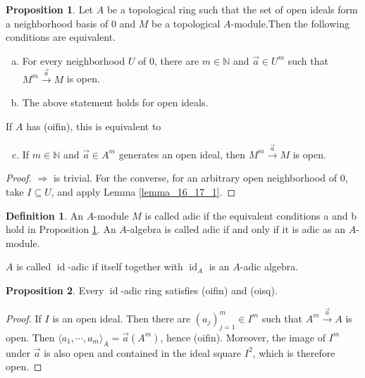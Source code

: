 \documentclass[10pt]{article}
\numberwithin{equation}{section}
\theoremstyle{definition}
\newtheorem{proposition}{Proposition}[subsection]
\newtheorem{definition}{Definition}[subsection]
\DeclareMathOperator{\id}{id}
\newcommand{\N}[0]{\mathbb{N}}
\begin{document}
\begin{proposition}
    \label{fact_16_18}
    Let $A$ be a topological ring such that the set of open ideals form a neighborhood basis of $0$ and $M$ be a topological $A$-module.Then the following conditions are equivalent.
    \begin{enumerate}[a.]
        \item For every neighborhood $U$ of $0$, there are $m\in\N$ and $\vec{a}\in U^m$ such that $M^m\stackrel{\vec{a}}{\to}M$ is open.
        \item The above statement holds for open ideals.
    \end{enumerate}
    If $A$ has (oifin), this is equivalent to
    \begin{enumerate}[a.]\setcounter{enumi}{2}
        \item If $m\in\N$ and $\vec{a}\in A^m$ generates an open ideal, then $M^m\stackrel{\vec{a}}{\to}M$ is open.
    \end{enumerate}
\end{proposition}
\begin{proof}
    $\Rightarrow$ is trivial. For the converse, for an arbitrary open neighborhood of $0$, take $I\subseteq U$, and apply Lemma \ref{lemma_16_17_1}.
\end{proof}
\begin{definition}
    An $A$-module $M$ is called adic if the equivalent conditions a and b hold in Proposition \ref{fact_16_18}. An $A$-algebra is called adic if and only if it is adic as an $A$-module.
    \par $A$ is called $\id$-adic if itself together with $\id_A$ is an $A$-adic algebra.
\end{definition}

\begin{proposition}
    \label{fact_16_19}
    Every $\id$-adic ring satisfies (oifin) and (oisq).
\end{proposition}
\begin{proof}
    If $I$ is an open ideal. Then there are $(a_j)^m_{j=1}\in I^m$ such that $A^m\stackrel{\vec{a}}{\to}A$ is open. Then $\langle a_1,\cdots,a_m\rangle_A = \vec{a}(A^m)$, hence (oifin).
    Moreover, the image of $I^m$ under $\vec{a}$ is also open and contained in the ideal square $I^2$, which is therefore open.
\end{proof}
\end{document}
